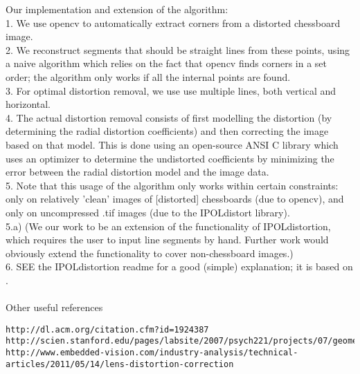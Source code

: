 Our implementation and extension of the algorithm:\\
1. We use opencv to automatically extract corners from a distorted chessboard image.\\
2. We reconstruct segments that should be straight lines from these points, using a naive algorithm which relies on the fact that opencv finds corners in a set order; the algorithm only works if all the internal points are found.\\
3. For optimal distortion removal, we use use multiple lines, both vertical and horizontal.\\
4. The actual distortion removal consists of first modelling the distortion (by determining the radial distortion coefficients) and then correcting the image based on that model. This is done using an open-source ANSI C library which uses an optimizer to determine the undistorted coefficients by minimizing the error between the radial distortion model and the image data.\\
5. Note that this usage of the algorithm only works within certain constraints: only on relatively 'clean' images of [distorted] chessboards (due to opencv), and only on uncompressed .tif images (due to the IPOLdistort library).\\
5.a) (We our work to be an extension of the functionality of IPOLdistortion, which requires the user to input line segments by hand. Further work would obviously extend the functionality to cover non-chessboard images.)\\
6. SEE the IPOLdistortion readme for a good (simple) explanation; it is based on \cite{algebraic-distortion}.\\\\

Other useful references\\
\begin{verbatim}
http://dl.acm.org/citation.cfm?id=1924387
http://scien.stanford.edu/pages/labsite/2007/psych221/projects/07/geometric_distortion/project.htm
http://www.embedded-vision.com/industry-analysis/technical-articles/2011/05/14/lens-distortion-correction
\end{verbatim}

